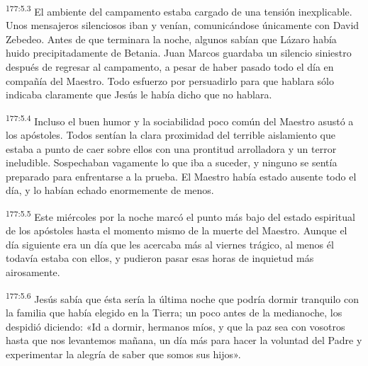 \par
\textsuperscript{177:5.3} El ambiente del campamento estaba cargado de una tensión inexplicable. Unos mensajeros silenciosos iban y venían, comunicándose únicamente con David Zebedeo. Antes de que terminara la noche, algunos sabían que Lázaro había huido precipitadamente de Betania. Juan Marcos guardaba un silencio siniestro después de regresar al campamento, a pesar de haber pasado todo el día en compañía del Maestro. Todo esfuerzo por persuadirlo para que hablara sólo indicaba claramente que Jesús le había dicho que no hablara.

\par
\textsuperscript{177:5.4} Incluso el buen humor y la sociabilidad poco común del Maestro asustó a los apóstoles. Todos sentían la clara proximidad del terrible aislamiento que estaba a punto de caer sobre ellos con una prontitud arrolladora y un terror ineludible. Sospechaban vagamente lo que iba a suceder, y ninguno se sentía preparado para enfrentarse a la prueba. El Maestro había estado ausente todo el día, y lo habían echado enormemente de menos.

\par
\textsuperscript{177:5.5} Este miércoles por la noche marcó el punto más bajo del estado espiritual de los apóstoles hasta el momento mismo de la muerte del Maestro. Aunque el día siguiente era un día que les acercaba más al viernes trágico, al menos él todavía estaba con ellos, y pudieron pasar esas horas de inquietud más airosamente.

\par
\textsuperscript{177:5.6} Jesús sabía que ésta sería la última noche que podría dormir tranquilo con la familia que había elegido en la Tierra; un poco antes de la medianoche, los despidió diciendo: «Id a dormir, hermanos míos, y que la paz sea con vosotros hasta que nos levantemos mañana, un día más para hacer la voluntad del Padre y experimentar la alegría de saber que somos sus hijos».